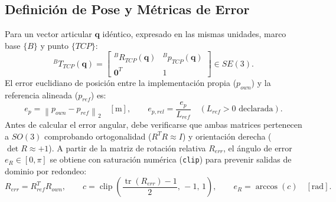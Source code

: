 \documentclass[10pt, a4paper]{article}
\begin{document}
\subsection{Definición de Pose y Métricas de Error}
Para un vector articular $\mathbf{q}$ idéntico, expresado en las mismas unidades, marco base $\{B\}$ y punto $\{TCP\}$:
\begin{equation}
    {}^{B}T_{TCP}(\mathbf{q}) =
    \begin{bmatrix}
        {}^{B}R_{TCP}(\mathbf{q}) & {}^{B}p_{TCP}(\mathbf{q}) \\
        \mathbf{0}^T & 1
    \end{bmatrix} \in SE(3).
    \label{eq:fk_homog}
\end{equation}
El error euclidiano de posición entre la implementación propia ($p_{own}$) y la referencia alineada ($p_{ref}$) es:
\begin{equation}
    \boxed{ e_p = \left\lVert p_{own} - p_{ref} \right\rVert_2 \quad [\mathrm{m}] }, \qquad
    e_{p,rel} = \frac{e_p}{L_{ref}} \quad (L_{ref} > 0\text{ declarada}).
    \label{eq:fk_ep}
\end{equation}
Antes de calcular el error angular, debe verificarse que ambas matrices pertenecen a $SO(3)$ comprobando ortogonalidad ($R^T R \approx I$) y orientación derecha ($\det R \approx +1$). A partir de la matriz de rotación relativa $R_{err}$, el ángulo de error $e_R \in [0, \pi]$ se obtiene con saturación numérica (\texttt{clip}) para prevenir salidas de dominio por redondeo:
\begin{equation}
    R_{err} = R_{ref}^T R_{own}, \qquad
    c = \operatorname{clip}\!\left(\frac{\operatorname{tr}(R_{err}) - 1}{2},\, -1,\, 1\right), \qquad
    \boxed{ e_R = \arccos(c) \quad [\mathrm{rad}] }.
    \label{eq:fk_er}
\end{equation}
\end{document}
